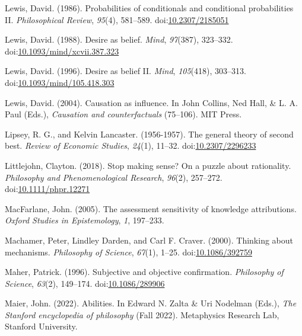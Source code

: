 \documentclass[
  10pt,
  letterpaper,
  twoside]{scrbook}
\newlength{\cslhangindent}
\newenvironment{CSLReferences}[2] %
 {\begin{list}{}{%
  \setlength{\itemindent}{0pt}
  \setlength{\leftmargin}{0pt}
  \setlength{\parsep}{0pt}
  \ifodd #1
   \setlength{\leftmargin}{\cslhangindent}
   \setlength{\itemindent}{-1\cslhangindent}
  \fi
  \setlength{\itemsep}{#2\baselineskip}}}
 {\end{list}}
\begin{document}
\begin{CSLReferences}{1}{0}
Lewis, David. (1986). Probabilities of conditionals and conditional
probabilities {II}. \emph{Philosophical Review}, \emph{95}(4), 581--589.
doi:\href{https://doi.org/10.2307/2185051}{10.2307/2185051}

Lewis, David. (1988). Desire as belief. \emph{Mind}, \emph{97}(387),
323--332.
doi:\href{https://doi.org/10.1093/mind/xcvii.387.323}{10.1093/mind/xcvii.387.323}

Lewis, David. (1996). Desire as belief {II}. \emph{Mind},
\emph{105}(418), 303--313.
doi:\href{https://doi.org/10.1093/mind/105.418.303}{10.1093/mind/105.418.303}

Lewis, David. (2004). Causation as influence. In John Collins, Ned Hall,
\& L. A. Paul (Eds.), \emph{Causation and counterfactuals} (75--106).
{MIT} Press.

Lipsey, R. G., and Kelvin Lancaster. (1956-1957). The general theory of
second best. \emph{Review of Economic Studies}, \emph{24}(1), 11--32.
doi:\href{https://doi.org/10.2307/2296233}{10.2307/2296233}

Littlejohn, Clayton. (2018). Stop making sense? On a puzzle about
rationality. \emph{Philosophy and Phenomenological Research},
\emph{96}(2), 257--272.
doi:\href{https://doi.org/10.1111/phpr.12271}{10.1111/phpr.12271}

MacFarlane, John. (2005). The assessment sensitivity of knowledge
attributions. \emph{Oxford Studies in Epistemology}, \emph{1}, 197--233.

Machamer, Peter, Lindley Darden, and Carl F. Craver. (2000). Thinking
about mechanisms. \emph{Philosophy of Science}, \emph{67}(1), 1--25.
doi:\href{https://doi.org/10.1086/392759}{10.1086/392759}

Maher, Patrick. (1996). Subjective and objective confirmation.
\emph{Philosophy of Science}, \emph{63}(2), 149--174.
doi:\href{https://doi.org/10.1086/289906}{10.1086/289906}

Maier, John. (2022). {Abilities}. In Edward N. Zalta \& Uri Nodelman
(Eds.), \emph{The {Stanford} encyclopedia of philosophy} ({F}all 2022).
Metaphysics Research Lab, Stanford University.


\end{CSLReferences}
\end{document}
